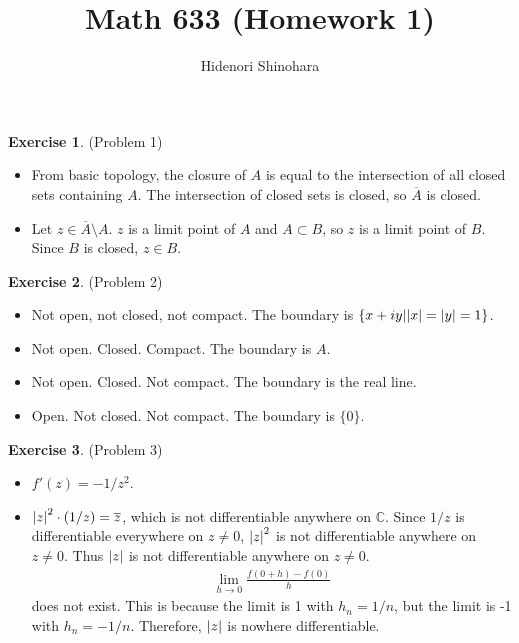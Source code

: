 \documentclass[12pt, psamsfonts]{amsart}
\theoremstyle{definition}
\newtheorem*{exer}{Exercise}
\theoremstyle{remark}
\numberwithin{equation}{section}
\begin{document}
\title{Math 633 (Homework 1)}
\author{Hidenori Shinohara}
\maketitle

\begin{exer}{(Problem 1)}
  \begin{itemize}
    \item
      From basic topology, the closure of $A$ is equal to the intersection of all closed sets containing $A$.
      The intersection of closed sets is closed, so $\overline{A}$ is closed.
    \item
      Let $z \in \overline{A} \setminus A$.
      $z$ is a limit point of $A$ and $A \subset B$, so $z$ is a limit point of $B$.
      Since $B$ is closed, $z \in B$.
  \end{itemize}
\end{exer}

\begin{exer}{(Problem 2)}
 \begin{itemize}
   \item
     Not open, not closed, not compact. The boundary is $\{ x + iy | \abs{x} = \abs{y} = 1 \}$.
   \item
     Not open. Closed. Compact. The boundary is $A$.
   \item
     Not open. Closed. Not compact. The boundary is the real line.
   \item
     Open. Not closed. Not compact. The boundary is $\{ 0 \}$.
 \end{itemize}
\end{exer}

\begin{exer}{(Problem 3)}
 \begin{itemize}
   \item
     $f'(z) = -1/z^2$.
   \item
     $\abs{z}^2 \cdot (1/z) = \overline{z}$, which is not differentiable anywhere on $\mathbb{C}$.
     Since $1 / z$ is differentiable everywhere on $z \ne 0$, $\abs{z}^2$ is not differentiable anywhere on $z \ne 0$.
     Thus $\abs{z}$ is not differentiable anywhere on $z \ne 0$.
     \begin{align*}
        \lim_{h \rightarrow 0} \frac{f(0 + h) - f(0)}{h}
     \end{align*}
     does not exist.
     This is because the limit is 1 with $h_n = 1 / n$, but the limit is -1 with $h_n = -1/n$.
     Therefore, $\abs{z}$ is nowhere differentiable.
 \end{itemize}
\end{exer}
\end{document}
